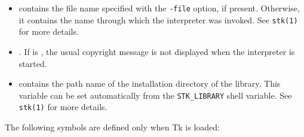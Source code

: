 \begin{itemize}
\item {\tt{}} contains
      the file name specified with the {\tt -file} option, if present.
      Otherwise, it contains the name through which the interpreter was invoked.
      See {\tt stk(1)} for more details.

\item {\tt{}}. If 
      {\tt{}} is {\schfalse}, the usual copyright
      message is not displayed when the interpreter is started.

\item {\tt{}}
  contains the path name of the installation directory of the
  {\stk} library. This variable can be set automatically from the
  {\tt STK\_LIBRARY} shell variable. See {\tt stk(1)} for more
  details.

\end{itemize}

The following symbols are defined only when Tk is loaded:

